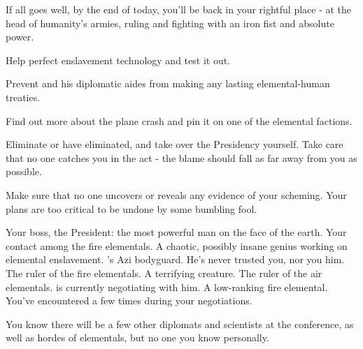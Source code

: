 \documentclass[char]{elementals}
\begin{document}
If all goes well, by the end of today, you'll be back in your rightful place - at the head of humanity's armies, ruling and fighting with an iron fist and absolute power. 

\begin{itemz}[Goals]
	\item  Help \cMS{} perfect \cMS{\their} enslavement technology and test it out.
	\item  Prevent \cLeader{} and his diplomatic aides from making any lasting elemental-human treaties.
	\item  Find out more about the plane crash and pin it on one of the elemental factions.
	\item  Eliminate \cLeader{} or have \cLeader{\them} eliminated, and take over the Presidency yourself. Take care that no one catches you in the act - the blame should fall as far away from you as possible.
	\item  Make sure that no one uncovers or reveals any evidence of your scheming. Your plans are too critical to be undone by some bumbling fool.
\end{itemz}

\begin{contacts}
	\contact{\cLeader{}}  Your boss, the President: the most powerful man on the face of the earth.
	\contact{\cPyro{}}  Your contact among the fire elementals.
	\contact{\cMS{}}  A chaotic, possibly insane genius working on elemental enslavement.
	\contact{\cRomeo{}}  \cLeader{}'s Azi bodyguard. He's never trusted you, nor you him.
	\contact{\cQueen{}}  The ruler of the fire elementals. A terrifying creature.
	\contact{\cKing{}}  The ruler of the air elementals. \cLeader{} is currently negotiating with him.
  \contact{\cJuliet{}} A low-ranking fire elemental. You've encountered \cJuliet{\them} a few times during your negotiations.
\end{contacts}
You know there will be a few other diplomats and scientists at the conference, as well as hordes of elementals, but no one you know personally.
\end{document}
